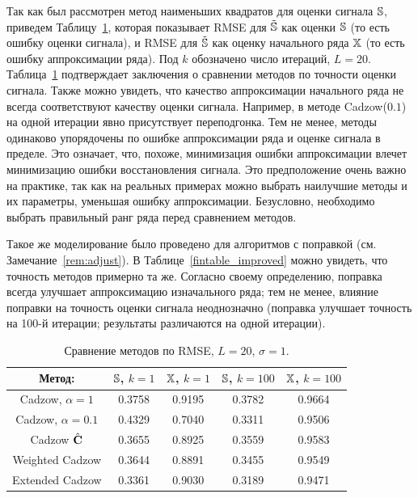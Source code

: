\documentclass[12pt, specialist, subf,href,colorlinks=true,substylefile = spbu.rtx]{disser}
\theoremstyle{remark}
\theoremstyle{definition}
\begin{document}
\smallskip
Так как был рассмотрен метод наименьших квадратов для оценки сигнала
$\mathbb{S}$, приведем Таблицу~\ref{fintable}, которая показывает RMSE для $\tilde {\mathbb{S}}$ как оценки $\mathbb{S}$ (то есть ошибку оценки сигнала), и RMSE для $\tilde {\mathbb{S}}$ как оценку начального ряда $\mathbb{X}$ (то есть ошибку аппроксимации ряда). Под $k$ обозначено число итераций, $L=20$. Таблица~\ref{fintable} подтверждает заключения о сравнении методов по точности оценки сигнала. Также можно увидеть, что качество аппроксимации начального ряда не всегда соответствуют качеству оценки сигнала. Например, в методе Cadzow($0.1$) на одной итерации явно присутствует переподгонка. Тем не менее, методы одинаково упорядочены по ошибке аппроксимации ряда и оценке сигнала в пределе. Это означает, что, похоже, минимизация ошибки аппроксимации влечет минимизацию ошибки восстановления сигнала.
Это предположение очень важно на практике, так как на реальных примерах можно выбрать наилучшие методы и их параметры, уменьшая ошибку аппроксимации.
Безусловно, необходимо выбрать правильный ранг ряда перед сравнением методов.

Такое же моделирование было проведено для алгоритмов с поправкой (см. Замечание~\ref{rem:adjust}). В Таблице~\ref{fintable_improved} можно увидеть, что точность методов примерно та же. Согласно своему определению, поправка всегда улучшает аппроксимацию изначального ряда; тем не менее, влияние поправки на точность оценки сигнала неоднозначно (поправка улучшает точность на 100-й итерации; результаты различаются на одной итерации).

\begin{table}[!hhh]
	\caption{Сравнение методов по RMSE, $L = 20$, $\sigma=1$.}\label{fintable}
	\begin{center}
	    \begin{tabular}{|c|c|c|c|c|}
    		\hline
    		Метод: & $\mathbb{S}$, $k = 1$ & $\mathbb{X}$, $k = 1$ & $\mathbb{S}$, $k = 100$ & $\mathbb{X}$, $k = 100$  \\
		    \hline
		    Cadzow, $\alpha = 1$ & 0.3758 & 0.9195 & 0.3782 & 0.9664 \\
		    \hline
		    Cadzow, $\alpha = 0.1$ & 0.4329 & 0.7040 & 0.3311 & 0.9506 \\
		    \hline
		    Cadzow $\hat{\mathbf{C}}$ & 0.3655 & 0.8925 & 0.3559 & 0.9583 \\
		    \hline
		    Weighted Cadzow & 0.3644 & 0.8891 & 0.3455 & 0.9549 \\
		    \hline
		    Extended Cadzow & 0.3361 & 0.9030 & 0.3189 & 0.9471 \\
		    \hline
	    \end{tabular}
	\end{center}
\end{table}
\end{document}
